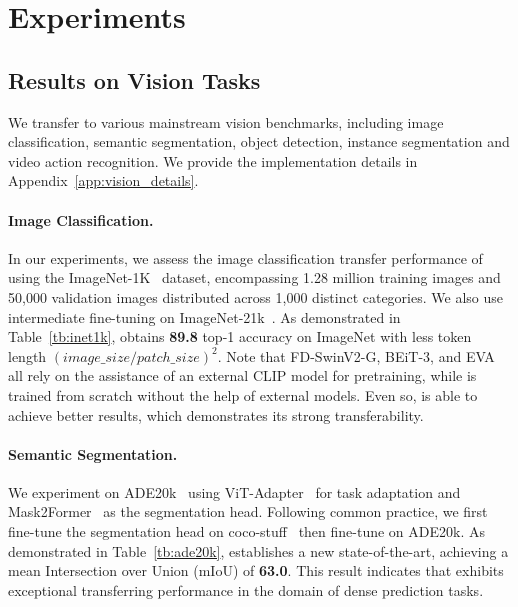 \section{Experiments}
\label{sec:experiments}

\subsection{Results on Vision Tasks}


We transfer \onepeace to various mainstream vision benchmarks, including image classification, semantic segmentation, object detection, instance segmentation and video action recognition. 
We provide the implementation details in Appendix~\ref{app:vision_details}.

\paragraph{Image Classification.} In our experiments, we assess the image classification transfer performance of \onepeace using the ImageNet-1K~\cite{inet1k} dataset, encompassing 1.28 million training images and 50,000 validation images distributed across 1,000 distinct categories. We also use intermediate fine-tuning on ImageNet-21k~\cite{imagenet}. As demonstrated in Table~\ref{tb:inet1k}, \onepeace obtains \textbf{89.8} top-1 accuracy on ImageNet with less token length $(image\_size / patch\_size)^2$. 
Note that FD-SwinV2-G, BEiT-3, and EVA all rely on the assistance of an external CLIP model for pretraining, while \onepeace is trained from scratch without the help of external models. Even so, \onepeace is able to achieve better results, which demonstrates its strong transferability.

\paragraph{Semantic Segmentation.} We experiment on ADE20k~\cite{Zhou2016SemanticUO} using ViT-Adapter~\cite{chen2022vitadapter} for task adaptation and Mask2Former~\cite{mask2former} as the segmentation head. Following common practice, we first fine-tune the segmentation head on coco-stuff~\cite{cocostuff} then fine-tune on ADE20k. As demonstrated in Table~\ref{tb:ade20k}, \onepeace establishes a new state-of-the-art, achieving a mean Intersection over Union (mIoU) of \textbf{63.0}. This result indicates that \onepeace exhibits exceptional transferring performance in the domain of dense prediction tasks.

